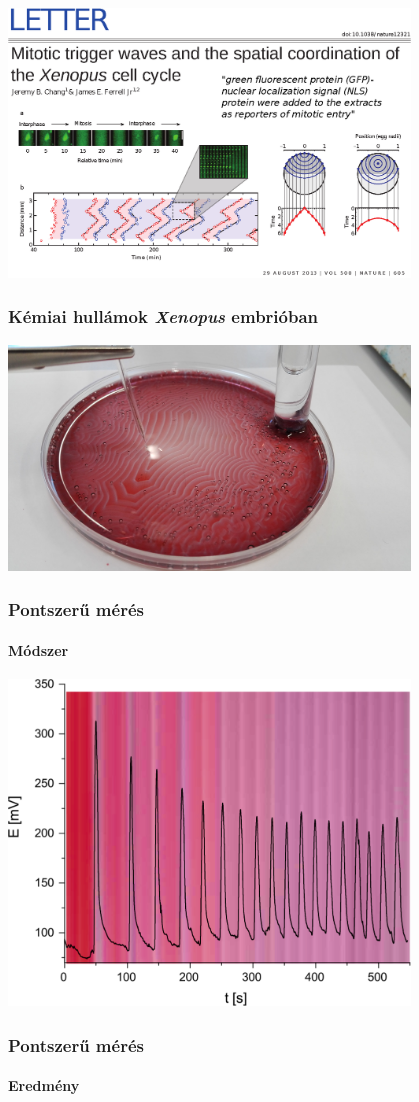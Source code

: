 \documentclass{beamer}
\begin{document}
\begin{frame}
	\centering
	\includegraphics[width=0.8\textwidth]{chang.eps}
	\frametitle{Kémiai hullámok \emph{Xenopus} embrióban}
\end{frame}

\begin{frame}
	\centering
	\includegraphics[width=0.8\textwidth]{setup1.jpg}
	\frametitle{Pontszerű mérés}
	\framesubtitle{Módszer}
\end{frame}

\begin{frame}
	\centering
	\includegraphics[width=0.8\textwidth]{pontszerumeres.eps}
	\frametitle{Pontszerű mérés}
	\framesubtitle{Eredmény}
\end{frame}
\end{document}
